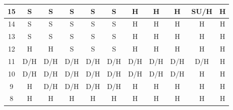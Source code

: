 \documentclass[conference]{IEEEtran}
\begin{document}
\begin{table}[h]
\begin{tabular}{|c|c|c|c|c|c|c|c|c|c|c|}
15 & \cellcolor[HTML]{32CB00}S & \cellcolor[HTML]{32CB00}S & \cellcolor[HTML]{32CB00}S & \cellcolor[HTML]{32CB00}S & \cellcolor[HTML]{32CB00}S & \cellcolor[HTML]{FE0000}H & \cellcolor[HTML]{FE0000}H & \cellcolor[HTML]{FE0000}H & \cellcolor[HTML]{34CDF9}SU/H & \cellcolor[HTML]{FE0000}H \\ \hline
14 & \cellcolor[HTML]{32CB00}S & \cellcolor[HTML]{32CB00}S & \cellcolor[HTML]{32CB00}S & \cellcolor[HTML]{32CB00}S & \cellcolor[HTML]{32CB00}S & \cellcolor[HTML]{FE0000}H & \cellcolor[HTML]{FE0000}H & \cellcolor[HTML]{FE0000}H & \cellcolor[HTML]{FE0000}H & \cellcolor[HTML]{FE0000}H \\ \hline
13 & \cellcolor[HTML]{32CB00}S & \cellcolor[HTML]{32CB00}S & \cellcolor[HTML]{32CB00}S & \cellcolor[HTML]{32CB00}S & \cellcolor[HTML]{32CB00}S & \cellcolor[HTML]{FE0000}H & \cellcolor[HTML]{FE0000}H & \cellcolor[HTML]{FE0000}H & \cellcolor[HTML]{FE0000}H & \cellcolor[HTML]{FE0000}H \\ \hline
12 & \cellcolor[HTML]{FE0000}H & \cellcolor[HTML]{FE0000}H & \cellcolor[HTML]{32CB00}S & \cellcolor[HTML]{32CB00}S & \cellcolor[HTML]{32CB00}S & \cellcolor[HTML]{FE0000}H & \cellcolor[HTML]{FE0000}H & \cellcolor[HTML]{FE0000}H & \cellcolor[HTML]{FE0000}H & \cellcolor[HTML]{FE0000}H \\ \hline
11 & \cellcolor[HTML]{FCFF2F}D/H & \cellcolor[HTML]{FCFF2F}D/H & \cellcolor[HTML]{FCFF2F}D/H & \cellcolor[HTML]{FCFF2F}D/H & \cellcolor[HTML]{FCFF2F}D/H & \cellcolor[HTML]{FCFF2F}D/H & \cellcolor[HTML]{FCFF2F}D/H & \cellcolor[HTML]{FCFF2F}D/H & \cellcolor[HTML]{FCFF2F}D/H & \cellcolor[HTML]{FE0000}H \\ \hline
10 & \cellcolor[HTML]{FCFF2F}D/H & \cellcolor[HTML]{FCFF2F}D/H & \cellcolor[HTML]{FCFF2F}D/H & \cellcolor[HTML]{FCFF2F}D/H & \cellcolor[HTML]{FCFF2F}D/H & \cellcolor[HTML]{FCFF2F}D/H & \cellcolor[HTML]{FCFF2F}D/H & \cellcolor[HTML]{FCFF2F}D/H & \cellcolor[HTML]{FE0000}H & \cellcolor[HTML]{FE0000}H \\ \hline
9 & \cellcolor[HTML]{FE0000}H & \cellcolor[HTML]{FCFF2F}D/H & \cellcolor[HTML]{FCFF2F}D/H & \cellcolor[HTML]{FCFF2F}D/H & \cellcolor[HTML]{FCFF2F}D/H & \cellcolor[HTML]{FE0000}H & \cellcolor[HTML]{FE0000}H & \cellcolor[HTML]{FE0000}H & \cellcolor[HTML]{FE0000}H & \cellcolor[HTML]{FE0000}H \\ \hline
8 & \cellcolor[HTML]{FE0000}H & \cellcolor[HTML]{FE0000}H & \cellcolor[HTML]{FE0000}H & \cellcolor[HTML]{FE0000}H & \cellcolor[HTML]{FE0000}H & \cellcolor[HTML]{FE0000}H & \cellcolor[HTML]{FE0000}H & \cellcolor[HTML]{FE0000}H & \cellcolor[HTML]{FE0000}H & \cellcolor[HTML]{FE0000}H \\ \hline

\end{tabular}
\end{table}
\end{document}
